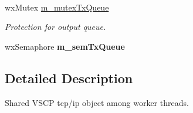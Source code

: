 \paragraph*{}
\begin{DoxyCompactItemize}
\item 
\hypertarget{classctrl_obj_vscp_tcp_if_a2055fb53e00b5e4b79c01d0ab2f1f2da}{
wxMutex \hyperlink{classctrl_obj_vscp_tcp_if_a2055fb53e00b5e4b79c01d0ab2f1f2da}{m\_\-mutexTxQueue}}
\label{d8/dde/classctrl_obj_vscp_tcp_if_a2055fb53e00b5e4b79c01d0ab2f1f2da}

\begin{DoxyCompactList}\small\item\em Protection for output queue. \end{DoxyCompactList}\item 
\hypertarget{classctrl_obj_vscp_tcp_if_afaa4ee8d3e416087e7bc193cf8260f4e}{
wxSemaphore {\bfseries m\_\-semTxQueue}}
\label{d8/dde/classctrl_obj_vscp_tcp_if_afaa4ee8d3e416087e7bc193cf8260f4e}

\end{DoxyCompactItemize}



\subsection{Detailed Description}
Shared VSCP tcp/ip object among worker threads. 

